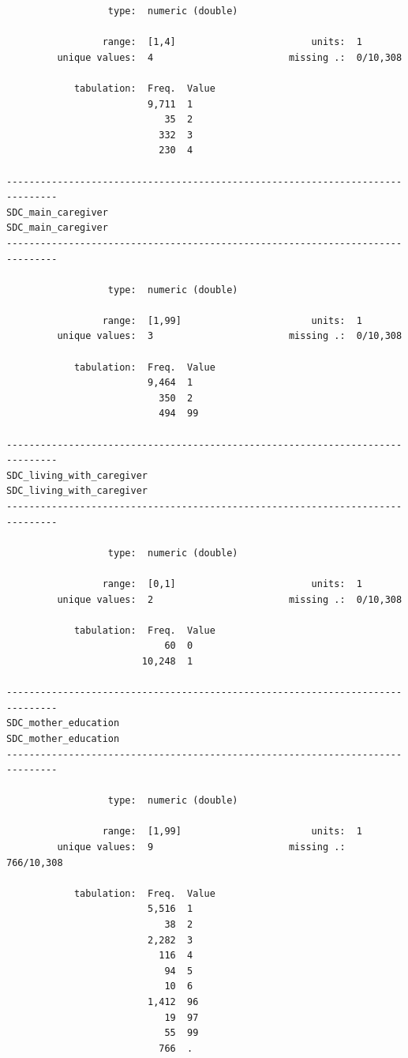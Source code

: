 \documentclass[
  letterpaper,
  DIV=11,
  numbers=noendperiod]{scrreprt}
\begin{document}
\begin{verbatim}
                  type:  numeric (double)

                 range:  [1,4]                        units:  1
         unique values:  4                        missing .:  0/10,308

            tabulation:  Freq.  Value
                         9,711  1
                            35  2
                           332  3
                           230  4

-------------------------------------------------------------------------------
SDC_main_caregiver                                           SDC_main_caregiver
-------------------------------------------------------------------------------

                  type:  numeric (double)

                 range:  [1,99]                       units:  1
         unique values:  3                        missing .:  0/10,308

            tabulation:  Freq.  Value
                         9,464  1
                           350  2
                           494  99

-------------------------------------------------------------------------------
SDC_living_with_caregiver                             SDC_living_with_caregiver
-------------------------------------------------------------------------------

                  type:  numeric (double)

                 range:  [0,1]                        units:  1
         unique values:  2                        missing .:  0/10,308

            tabulation:  Freq.  Value
                            60  0
                        10,248  1

-------------------------------------------------------------------------------
SDC_mother_education                                       SDC_mother_education
-------------------------------------------------------------------------------

                  type:  numeric (double)

                 range:  [1,99]                       units:  1
         unique values:  9                        missing .:  766/10,308

            tabulation:  Freq.  Value
                         5,516  1
                            38  2
                         2,282  3
                           116  4
                            94  5
                            10  6
                         1,412  96
                            19  97
                            55  99
                           766  .


\end{verbatim}
\end{document}

